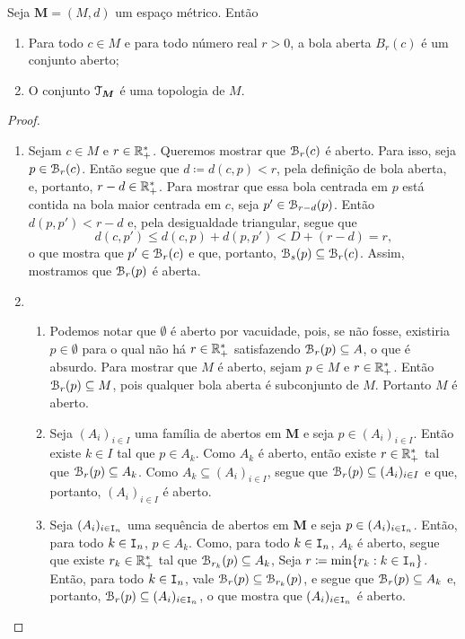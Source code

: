 \begin{prop}
Seja $\bm M = (M,d)$ um espaço métrico. Então
	\begin{enumerate}
	\item Para todo $c \in M$ e para todo número real $r > 0$, a bola aberta $B_r(c)$ é um conjunto aberto;
	\item O conjunto $\mathcal{T}_{\bm M}$ é uma topologia de $M$.
	\end{enumerate}
\end{prop}
\begin{proof}
	\begin{enumerate}
	\item Sejam $c \in M$ e $r \in \mathbb{R}_+^*$. Queremos mostrar que $\mathcal{B}_r(c)$ é aberto. Para isso, seja $p \in \mathcal{B}_r(c)$. Então segue que $d \coloneqq d(c,p) < r$, pela definição de bola aberta, e, portanto, $r-d \in \mathbb{R}_+^*$. Para mostrar que essa bola centrada em $p$ está contida na bola maior centrada em $c$, seja $p' \in \mathcal{B}_{r-d}(p)$. Então $d(p,p')<r-d$ e, pela desigualdade triangular, segue que
	\begin{equation*}
	d(c,p') \leq d(c,p) + d(p,p') < D + (r-d) = r,
	\end{equation*}
o que mostra que $p' \in \mathcal{B}_r(c)$ e que, portanto, $\mathcal{B}_s(p) \subseteq \mathcal{B}_r(c)$. Assim, mostramos que $\mathcal{B}_r(p)$ é aberta.
	
	\item
		\begin{enumerate}
		\item Podemos notar que $\emptyset$ é aberto por vacuidade, pois, se não fosse, existiria $p \in \emptyset$ para o qual não há $r \in \mathbb{R}_+^*$ satisfazendo $\mathcal{B}_r(p) \subseteq A$, o que é absurdo.
	Para mostrar que $M$ é aberto, sejam $p \in M$ e $r \in \mathbb{R}_+^*$. Então $\mathcal{B}_r(p) \subseteq M$, pois qualquer bola aberta é subconjunto de $M$. Portanto $M$ é aberto.
	
		\item Seja $(A_i)_{i \in I}$ uma família de abertos em $\bm M$ e seja $p \in (A_i)_{i \in I}$. Então existe $k \in I$ tal que $p \in A_k$. Como $A_k$ é aberto, então existe $r \in \mathbb{R}_+^*$ tal que $\mathcal{B}_r(p) \subseteq A_k$. Como $A_k \subseteq (A_i)_{i \in I}$, segue que $\mathcal{B}_r(p) \subseteq (A_i)_{i \in I}$ e que, portanto, $(A_i)_{i \in I}$ é aberto.
	
		\item Seja $(A_i)_{i \in \mathtt I_n}$ uma sequência de abertos em $\bm M$ e seja $p \in (A_i)_{i \in \mathtt I_n}$. Então, para todo $k \in \mathtt I_n$, $p \in A_k$. Como, para todo $k \in \mathtt I_n$, $A_k$ é aberto, segue que existe $r_k \in \mathbb{R}_+^*$ tal que $\mathcal{B}_{r_k}(p) \subseteq A_k$, Seja $r \coloneqq \min \{r_k : k \in \mathtt I_n\}$. Então, para todo $k \in \mathtt I_n$, vale $\mathcal{B}_r(p) \subseteq \mathcal{B}_{r_k}(p)$, e segue que $\mathcal{B}_r(p) \subseteq A_k$ e, portanto, $\mathcal{B}_r(p) \subseteq (A_i)_{i \in \mathtt I_n}$, o que mostra que $(A_i)_{i \in \mathtt I_n}$ é aberto.
		\end{enumerate}		
	\end{enumerate}
\end{proof}

